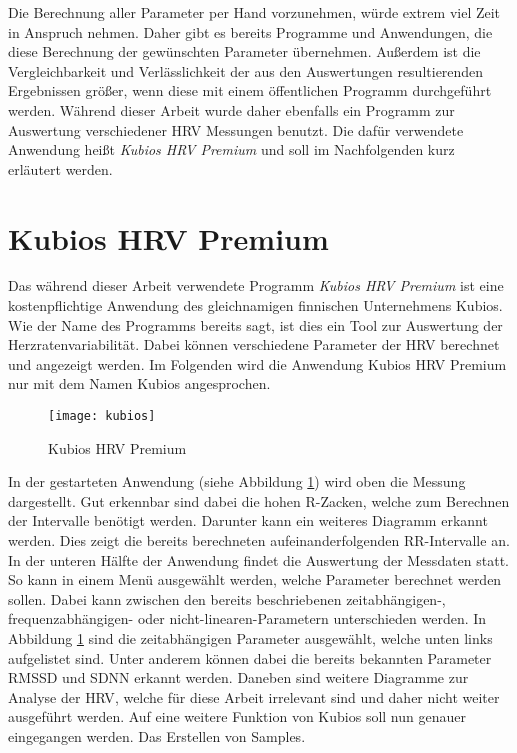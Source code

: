 Die Berechnung aller Parameter per Hand vorzunehmen, würde extrem viel Zeit in Anspruch nehmen. Daher gibt es bereits Programme und Anwendungen, die diese Berechnung der gewünschten Parameter übernehmen. Außerdem ist die Vergleichbarkeit und Verlässlichkeit der aus den Auswertungen resultierenden Ergebnissen größer, wenn diese mit einem öffentlichen Programm durchgeführt werden. Während dieser Arbeit wurde daher ebenfalls ein Programm zur Auswertung verschiedener \acs{HRV} Messungen benutzt. Die dafür verwendete Anwendung heißt \textit{Kubios HRV Premium} und soll im Nachfolgenden kurz erläutert werden. 

\section{Kubios HRV Premium}
Das während dieser Arbeit verwendete Programm \textit{Kubios HRV Premium} ist eine kostenpflichtige Anwendung des gleichnamigen finnischen Unternehmens Kubios. Wie der Name des Programms bereits sagt, ist dies ein Tool zur Auswertung der Herzratenvariabilität. Dabei können verschiedene Parameter der \acs{HRV} berechnet und angezeigt werden.
Im Folgenden wird die Anwendung Kubios HRV Premium nur mit dem Namen Kubios angesprochen. 
 \begin{figure}[H]
	\centering
	\texttt{[image: kubios]}
	\caption{Kubios HRV Premium}
	\label{fig:kubios}
\end{figure}

In der gestarteten Anwendung (siehe Abbildung \ref{fig:kubios}) wird oben die Messung dargestellt. Gut erkennbar sind dabei die hohen R-Zacken, welche zum Berechnen der Intervalle benötigt werden. Darunter kann ein weiteres Diagramm erkannt werden. Dies zeigt die bereits berechneten aufeinanderfolgenden RR-Intervalle an. In der unteren Hälfte der Anwendung findet die Auswertung der Messdaten statt. So kann in einem Menü ausgewählt werden, welche Parameter berechnet werden sollen. Dabei kann zwischen den bereits beschriebenen zeitabhängigen-, frequenzabhängigen- oder nicht-linearen-Parametern unterschieden werden. In Abbildung \ref{fig:kubios} sind die zeitabhängigen Parameter ausgewählt, welche unten links aufgelistet sind. Unter anderem können dabei die bereits bekannten Parameter \acs{RMSSD} und \acs{SDNN} erkannt werden. Daneben sind weitere Diagramme zur Analyse der \acs{HRV}, welche für diese Arbeit irrelevant sind und daher nicht weiter ausgeführt werden. Auf eine weitere Funktion von Kubios soll nun genauer eingegangen werden. Das Erstellen von Samples. \\

